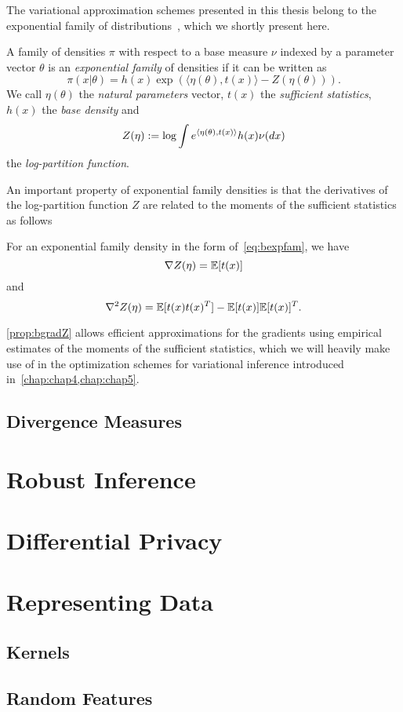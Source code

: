 The variational approximation schemes presented in this thesis belong to the exponential family of distributions~\citep{wainwright08}, which we shortly present here.

\begin{ndefn} \label{def:bexpfam}
A family of densities $\pi$ with respect to a base measure $\nu$ indexed by a parameter vector $\theta$ is an \emph{exponential family} of densities if it can be written as
\[
\pi(x|\theta) = h(x) \exp\left( \langle \eta(\theta), t(x) \rangle - Z(\eta(\theta)) \right).
\label{eq:bexpfam}
\]
We call $\eta(\theta)$ the \emph{natural parameters} vector, $t(x)$ the \emph{sufficient statistics}, $h(x)$ the \emph{base density} and 
\[
Z(\eta):= \log \int e^{\langle \eta(\theta), t(x) \rangle } h(x) \nu(dx)
\label{eq:b-logpartition}
\]
the \emph{log-partition function}.
\end{ndefn}

An important property of exponential family densities is that the derivatives of the log-partition function $Z$ are related to the moments of the sufficient statistics as follows

\begin{nprop} \label{prop:bgradZ}
For an exponential family density in the form of~\cref{eq:bexpfam}, we have 
\[
\nabla Z(\eta) = \mathbb{E}[t(x)]
\label{eq:bgradZ}
\] 	
and 
\[
\nabla^2Z(\eta) = \mathbb{E}[t(x)t(x)^T] - \mathbb{E}[t(x)]\mathbb{E}[t(x)]^T.
\label{eq:bhessZ}
\]
\end{nprop}

\cref{prop:bgradZ} allows efficient approximations for the gradients using empirical estimates of the moments of the sufficient statistics, which we will heavily make use of in the optimization schemes for variational inference introduced in~\cref{chap:chap4,chap:chap5}.


\subsection{Divergence Measures}
\label{subsec:b-divergences}

\section{Robust Inference}
\label{sec:b-robust-inference}

\section{Differential Privacy}
\label{sec:b-differential-privacy}

\section{Representing Data}
\label{sec:b-representing-data}

\subsection{Kernels}
\label{subsec:b-kernels}

\subsection{Random Features}
\label{subsec:b-random-features}






